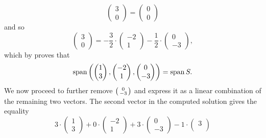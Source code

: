\begin{probsol}
\[  \begin{pmatrix}
   3\\
   0
  \end{pmatrix} =
  \begin{pmatrix}
   0\\
   0
  \end{pmatrix}
 \]
 and so
 \begin{equation}
  \label{eq:fourth-as-lc}
  \begin{pmatrix}
   3\\
   0
  \end{pmatrix}
  = -\frac{3}{2} \cdot 
  \begin{pmatrix}
   -2\\
   1
  \end{pmatrix}
  -\frac{1}{2} \cdot 
  \begin{pmatrix}
   0\\
   -3
  \end{pmatrix},
 \end{equation}
 which by  proves that
 \[
  \operatorname{span} \left( 
   \begin{pmatrix}
    1\\
    3
   \end{pmatrix},
   \begin{pmatrix}
    -2\\
    1
   \end{pmatrix},
   \begin{pmatrix}
    0\\
    -3
   \end{pmatrix}
  \right) = \operatorname{span} S.
 \]
 We now proceed to further remove $\begin{psmallmatrix} 0 \\-3
 \end{psmallmatrix}$ and express it as a linear combination of the remaining two
 vectors. The second vector in the computed solution gives the equality
 \[
  3 \cdot 
  \begin{pmatrix}
   1\\
   3
  \end{pmatrix}
  +0 \cdot 
  \begin{pmatrix}
   -2\\
   1
  \end{pmatrix}
  +3 \cdot 
  \begin{pmatrix}
   0\\
   -3
  \end{pmatrix}
  -1 \cdot 
  \begin{pmatrix}
   3\\

\end{pmatrix}\]
\end{probsol}

